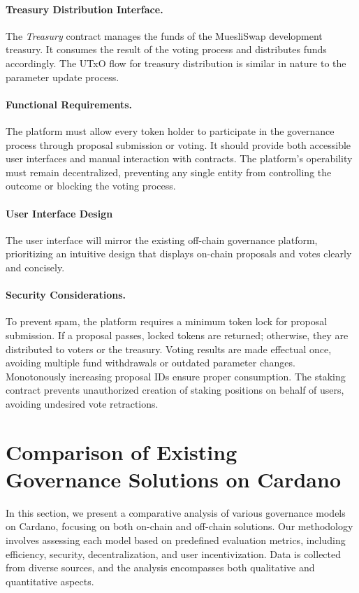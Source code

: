 \documentclass[11pt]{article}
\begin{document}
\paragraph{Treasury Distribution Interface.} The \emph{Treasury} contract manages the funds of the MuesliSwap development treasury. It consumes the result of the voting process and distributes funds accordingly. The UTxO flow for treasury distribution is similar in nature to the parameter update process.

\paragraph{Functional Requirements.} The platform must allow every token holder to participate in the governance process through proposal submission or voting. It should provide both accessible user interfaces and manual interaction with contracts. The platform's operability must remain decentralized, preventing any single entity from controlling the outcome or blocking the voting process.

\paragraph{User Interface Design} The user interface will mirror the existing off-chain governance platform, prioritizing an intuitive design that displays on-chain proposals and votes clearly and concisely.

\paragraph{Security Considerations.} To prevent spam, the platform requires a minimum token lock for proposal submission. If a proposal passes, locked tokens are returned; otherwise, they are distributed to voters or the treasury. Voting results are made effectual once, avoiding multiple fund withdrawals or outdated parameter changes. Monotonously increasing proposal IDs ensure proper consumption. The staking contract prevents unauthorized creation of staking positions on behalf of users, avoiding undesired vote retractions.


\section{Comparison of Existing Governance Solutions on Cardano}

In this section, we present a comparative analysis of various governance models on Cardano, focusing on both on-chain and off-chain solutions. Our methodology involves assessing each model based on predefined evaluation metrics, including efficiency, security, decentralization, and user incentivization. Data is collected from diverse sources, and the analysis encompasses both qualitative and quantitative aspects.
\end{document}
